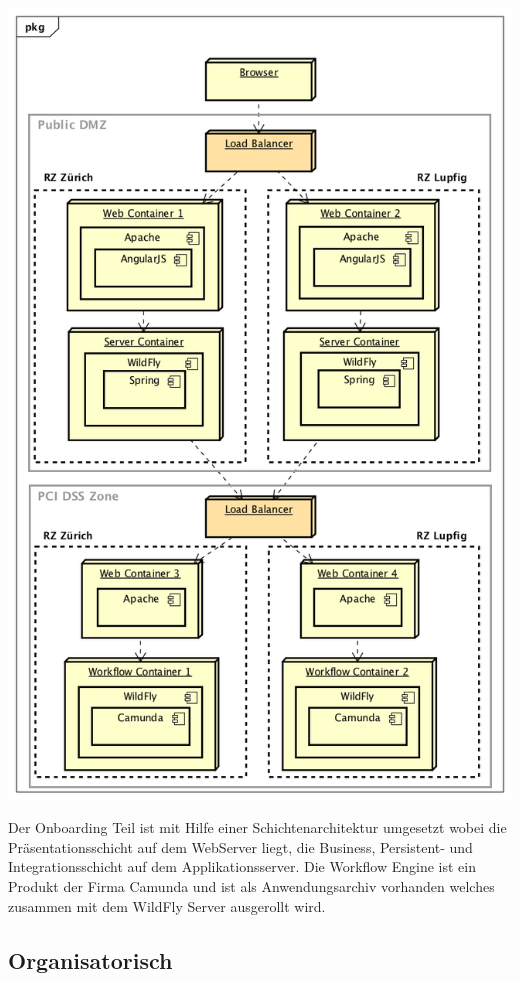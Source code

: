 \begin{center}
	\includegraphics[scale=0.6]{CurrentDeployment.png}
\end{center}
Der Onboarding Teil ist mit Hilfe einer Schichtenarchitektur umgesetzt wobei die Präsentationsschicht auf dem WebServer liegt, die Business, Persistent- und Integrationsschicht auf dem Applikationsserver. Die Workflow Engine ist ein Produkt der Firma Camunda und ist als Anwendungsarchiv vorhanden welches zusammen mit dem WildFly Server ausgerollt wird.

\subsection{Organisatorisch}

